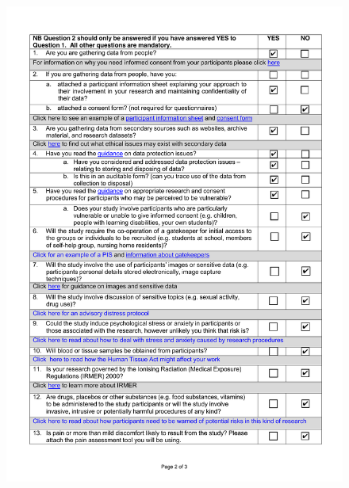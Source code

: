 \documentclass[a4paper,12pt]{report}
\begin{document}
\begin{appendices}
    \begin{figure}[h]
      \centering
      \includegraphics[scale=0.8]{ethics-checklist-2}
    \end{figure}


\end{appendices}
\end{document}
